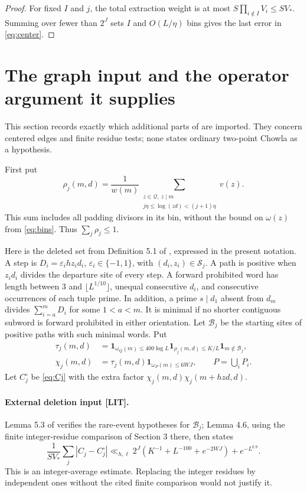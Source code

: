 \documentclass[11pt,a4paper]{article}
\numberwithin{equation}{section}
\theoremstyle{remark}\newtheorem{remark}[theorem]{Remark}
\newcommand{\1}{\mathbf 1}
\begin{document}
\begin{proof}
For fixed $I$ and $j$, the total extraction weight is at most
$S\prod_{i\notin I}V_i\le SV_*$. Summing over fewer than $2^J$ sets
$I$ and $O(L/\eta)$ bins gives the last error in \eqref{eq:center}.
\end{proof}

\section{The graph input and the operator argument it supplies}
\label{sec:graph}

This section records exactly which additional parts of \cite{final}
are imported. They concern centered edges and finite residue tests;
none states ordinary two-point Chowla as a hypothesis.

First put
\[
 \rho_j(m,d)=\frac1{w(m)}
   \sum_{\substack{z\in\mathcal Q,\ z\mid m\\
             j\eta\le\log(zd)<(j+1)\eta}}v(z).
\]
This sum includes all padding divisors in its bin, without the bound
on $\omega(z)$ from \eqref{eq:bins}. Thus $\sum_j\rho_j\le1$.

Here is the deleted set from Definition 5.1 of \cite{final}, expressed
in the present notation. A step is $D_i=\varepsilon_i h z_i d_i$,
$\varepsilon_i\in\{-1,1\}$, with $(d_i,z_i)\in\mathcal S_j$.
A path is positive when $z_id_i$ divides the departure site of every
step. A forward prohibited word has length between $3$ and
$\lfloor L^{1/10}\rfloor$, unequal consecutive $d_i$, and consecutive
occurrences of each tuple prime. In addition, a prime $s\mid d_1$
absent from $d_m$ divides $\sum_{i=a}^mD_i$ for some $1<a<m$.
It is minimal if no shorter contiguous subword is forward prohibited
in either orientation. Let $\mathcal B_j$ be the starting sites of
positive paths with such minimal words. Put
\begin{equation}\label{eq:cutsdef}
 \begin{split}
 \tau_j(m,d)&=\1_{\omega_Q(m)\le400\log L}
       \1_{\rho_j(m,d)\le K/L}\1_{m\notin\mathcal B_j},\\
 \chi_j(m,d)&=\tau_j(m,d)\1_{\omega_P(m)\le6WJ},
       \qquad P=\bigcup_iP_i.
 \end{split}
\end{equation}
Let $C_j^\circ$ be \eqref{eq:Cj} with the extra factor
$\chi_j(m,d)\chi_j(m+hzd,d)$.

\paragraph{External deletion input {\rm[LIT]}.}
Lemma 5.3 of \cite{final} verifies the rare-event hypotheses for
$\mathcal B_j$; Lemma 4.6, using the finite integer-residue comparison
of Section 3 there, then states
\begin{equation}\label{eq:deletion}
 \frac1{SV_*}\sum_j|C_j-C_j^\circ|
 \ll_{h,\ell}2^J(K^{-1}+L^{-100}+e^{-2WJ})+e^{-L^{0.9}}.
\end{equation}
This is an integer-average estimate. Replacing the integer residues by
independent ones without the cited finite comparison would not justify it.
\end{document}
